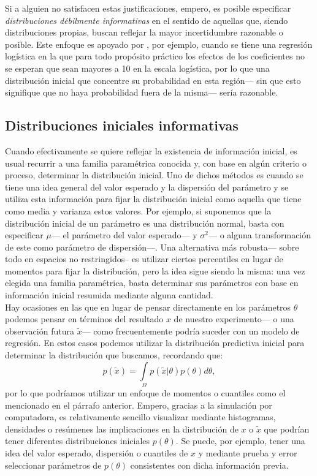 {Si a alguien no satisfacen estas justificaciones, empero, es posible especificar \textit{distribuciones débilmente informativas} en el sentido de aquellas que, siendo distribuciones propias, buscan reflejar la mayor incertidumbre razonable o posible. Este enfoque es apoyado por \textcite[55,415-416]{Gelman13}, por ejemplo, cuando se tiene una regresión logística en la que para todo propósito práctico los efectos de los coeficientes no se esperan que sean mayores a 10 en la escala logística, por lo que una distribución inicial que concentre su probabilidad en esta región--- sin que esto signifique que no haya probabilidad fuera de la misma--- sería razonable. 

\subsection*{Distribuciones iniciales informativas}

Cuando efectivamente se quiere reflejar la existencia de información inicial, es usual recurrir a una familia paramétrica conocida y, con base en algún criterio o proceso, determinar la distribución inicial. Uno de dichos métodos es cuando se tiene una idea general del valor esperado y la dispersión del parámetro y se utiliza esta información para fijar la distribución inicial como aquella que tiene como media y varianza estos valores. Por ejemplo, si suponemos que la distribución inicial de un parámetro es una distribución normal, basta con especificar $\mu$--- el parámetro del valor esperado--- y $\sigma^2$--- o alguna transformación de este como parámetro de dispersión---. Una alternativa más robusta--- sobre todo en espacios no restringidos-- es utilizar ciertos percentiles en lugar de momentos para fijar la distribución, pero la idea sigue siendo la misma: una vez elegida una familia paramétrica, basta determinar sus parámetros con base en información inicial resumida mediante alguna cantidad.\\

Hay ocasiones en las que en lugar de pensar directamente en los parámetros $\theta$ podemos pensar en términos del resultado $x$ de nuestro experimento--- o una observación futura $\tilde{x}$--- como frecuentemente podría suceder con un modelo de regresión. En estos casos podemos utilizar la distribución predictiva inicial para determinar la distribución que buscamos, recordando que: 
\begin{equation*}
p(\tilde{x}) = \int\limits_\Omega p(\tilde{x}|\theta)p(\theta)d\theta,
\end{equation*} 
por lo que podríamos utilizar un enfoque de momentos o cuantiles como el mencionado en el párrafo anterior. Empero, gracias a la simulación por computadora, es relativamente sencillo visualizar mediante histogramas, densidades o resúmenes las implicaciones en la distribución de $x$ o $\tilde{x}$ que podrían tener diferentes distribuciones iniciales $p(\theta)$. Se puede, por ejemplo, tener una idea del valor esperado, dispersión o cuantiles de $x$ y mediante prueba y error seleccionar parámetros de $p(\theta)$ consistentes con dicha información previa.\\

}
